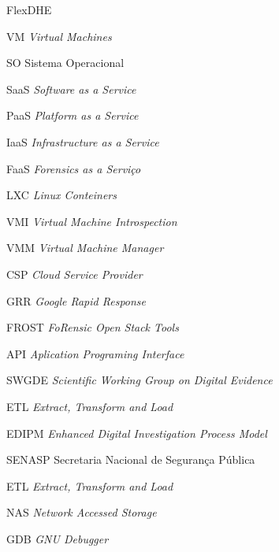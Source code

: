 \documentclass[a4paper,capchap,espacoduplo,normaltoc]{abntepusp}
\newcommand{\hash}{\mathcal{H}}
\newcommand{\bigO}{\mathcal{O}}
\begin{document}
\listoffigures
\listoftables

\begin{listofabbrv}{FlexDHE}
    \item [VM] \textit{Virtual Machines}
    \item [SO] Sistema Operacional
    \item [SaaS] \textit{Software as a Service}
    \item [PaaS] \textit{Platform as a Service}
    \item [IaaS] \textit{Infrastructure as a Service}
    \item [FaaS] \textit{Forensics as a Serviço}
    \item [LXC] \textit{Linux Conteiners}
    \item [VMI] \textit{Virtual Machine Introspection}
    \item [VMM] \textit{Virtual Machine Manager}
    \item [CSP] \textit{Cloud Service Provider}
    \item [GRR] \textit{Google Rapid Response}
    \item [FROST] \textit{FoRensic Open Stack Tools} 
    \item [API] \textit{Aplication Programing Interface}
    \item [SWGDE] \textit{Scientific Working Group on Digital Evidence}
    \item [ETL] \textit{Extract, Transform and Load}
    \item [EDIPM] \textit{Enhanced Digital Investigation Process Model}
    \item [SENASP] Secretaria Nacional de Segurança Pública
    \item [ETL] \textit{Extract, Transform and Load}
    \item [NAS] \textit{Network Accessed Storage}
    \item [GDB] \textit{GNU Debugger}
\end{listofabbrv}



\tableofcontents










\appendix

%
\end{document}
